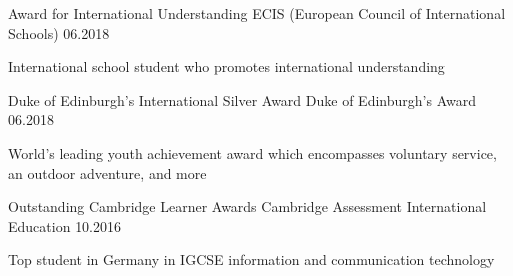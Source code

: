
\begin{cventries}

    \cventry
    {Award for International Understanding} %
    {ECIS (European Council of International Schools)} %
    {}
    {06.2018}
    {
    \begin{cvitems}
        \item {International school student who promotes international understanding}
    \end{cvitems}
    }

    \cventry
    {Duke of Edinburgh's International Silver Award} %
    {Duke of Edinburgh's Award} %
    {}
    {06.2018}
    {
    \begin{cvitems}
        \item {World’s leading youth achievement award which encompasses voluntary service, an outdoor adventure, and more}
    \end{cvitems}
    }
    
    \cventry
    {Outstanding Cambridge Learner Awards} %
    {Cambridge Assessment International Education} %
    {}
    {10.2016}
    {
    \begin{cvitems}
        \item {Top student in Germany in IGCSE information and communication technology}
    \end{cvitems}
    }
      
\end{cventries}




